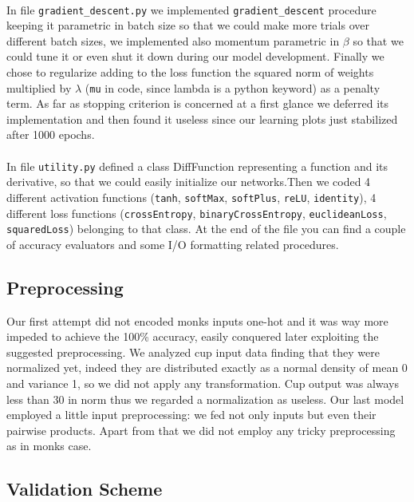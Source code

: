 \paragraph{}
In file \texttt{gradient\_descent.py} we implemented \texttt{gradient\_descent} procedure keeping it parametric in batch size so that we could make more trials over different batch sizes, we implemented also momentum parametric in $\beta$ so that we could tune it or even shut it down during our model development.
Finally we chose to regularize adding to the loss function the squared norm of weights multiplied by $\lambda$ (\texttt{mu} in code, since lambda is a python keyword) as a penalty term. As far as stopping criterion is concerned at a first glance we deferred its implementation and then found it useless since our learning plots just stabilized after 1000 epochs.

\paragraph{}
In file \texttt{utility.py} defined a class DiffFunction representing a function and its derivative, so that we could easily initialize our networks.Then we coded 4 different activation functions (\texttt{tanh}, \texttt{softMax}, \texttt{softPlus}, \texttt{reLU}, \texttt{identity}), 4 different loss functions (\texttt{crossEntropy}, \texttt{binaryCrossEntropy}, \texttt{euclideanLoss}, \texttt{squaredLoss}) belonging to that class. At the end of the file you can find a couple of accuracy evaluators and some I/O formatting related procedures.

\subsection{Preprocessing}

Our first attempt did not encoded monks inputs one-hot and it was way more impeded to achieve the 100\% accuracy, easily conquered later exploiting the suggested preprocessing. We analyzed cup input data finding that they were normalized yet, indeed they are distributed exactly as a normal density of mean 0 and variance 1, so we did not apply any transformation. Cup output was always less than 30 in norm thus we regarded a normalization as useless. Our last model employed a little input preprocessing: we fed not only inputs but even their pairwise products. Apart from that we did not employ any tricky preprocessing as in monks case.

\subsection{Validation Scheme}

